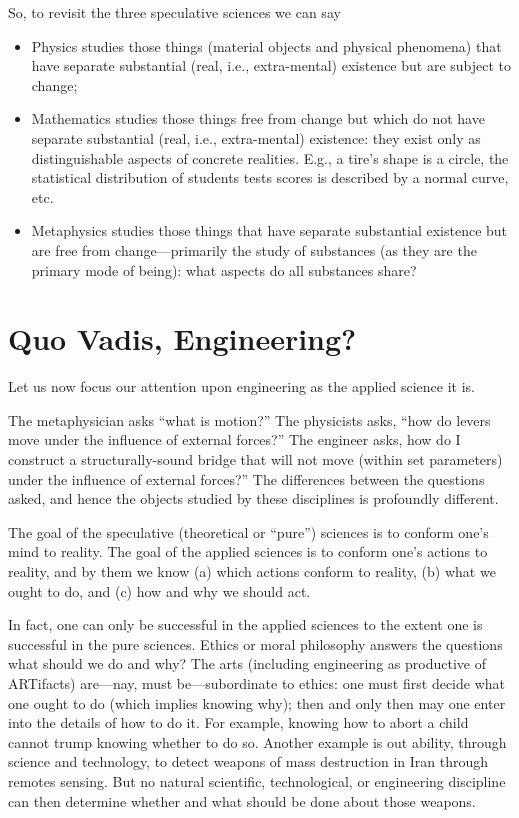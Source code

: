 So, to revisit the three speculative sciences we can say

\begin{itemize}
\item Physics studies those things (material objects and physical phenomena) that have separate substantial (real, i.e., extra-mental) existence but are subject to change;
\item Mathematics studies those things free from change but which do not have separate substantial (real, i.e., extra-mental) existence: they exist only as distinguishable aspects of concrete realities. E.g., a tire’s shape is a circle, the statistical distribution of students tests scores is described by a normal curve, etc.
\item Metaphysics studies those things that have separate substantial existence but are free from change—primarily the study of substances (as they are the primary mode of being): what aspects do all substances share?
\end{itemize}

\section{Quo Vadis, Engineering?}

Let us now focus our attention upon engineering as the applied science it is.

The metaphysician asks “what is motion?” The physicists asks, “how do levers move under the influence of external forces?” The engineer asks, how do I construct a structurally-sound bridge that will not move (within set parameters) under the influence of external forces?” The differences between the questions asked, and hence the objects studied by these disciplines is profoundly different.

The goal of the speculative (theoretical or “pure”) sciences is to conform one’s mind to reality. The goal of the applied sciences is to conform one’s actions to reality, and by them we know (a) which actions conform to reality, (b) what we ought to do, and (c) how and why we should act.

In fact, one can only be successful in the applied sciences to the extent one is successful in the pure sciences. Ethics or moral philosophy answers the questions what should we do and why? The arts (including engineering as productive of ARTifacts) are—nay, must be—subordinate to ethics: one must first decide what one ought to do (which implies knowing why); then and only then may one enter into the details of how to do it. For example, knowing how to abort a child cannot trump knowing whether to do so. Another example is out ability, through science and technology, to detect weapons of mass destruction in Iran through remotes sensing. But no natural scientific, technological, or engineering discipline can then determine whether and what should be done about those weapons.

